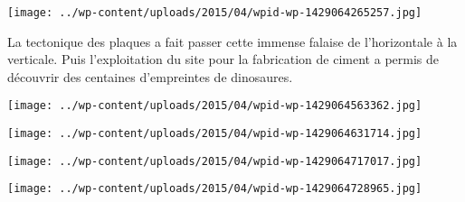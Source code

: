 \centerline{\texttt{[image: ../wp-content/uploads/2015/04/wpid-wp-1429064265257.jpg]} } 
 \newline
 La tectonique des plaques a fait passer cette immense falaise de l'horizontale à la verticale. Puis l'exploitation du site pour la fabrication de ciment a permis de découvrir des centaines d'empreintes de dinosaures.  \newline
 \newline
\centerline{\texttt{[image: ../wp-content/uploads/2015/04/wpid-wp-1429064563362.jpg]} } 
 \newline
 \newline
\centerline{\texttt{[image: ../wp-content/uploads/2015/04/wpid-wp-1429064631714.jpg]} } 
 \newline
 \newline
\centerline{\texttt{[image: ../wp-content/uploads/2015/04/wpid-wp-1429064717017.jpg]} } 
 \newline
 \newline
\centerline{\texttt{[image: ../wp-content/uploads/2015/04/wpid-wp-1429064728965.jpg]} } 
 \newline

\newpage
 
